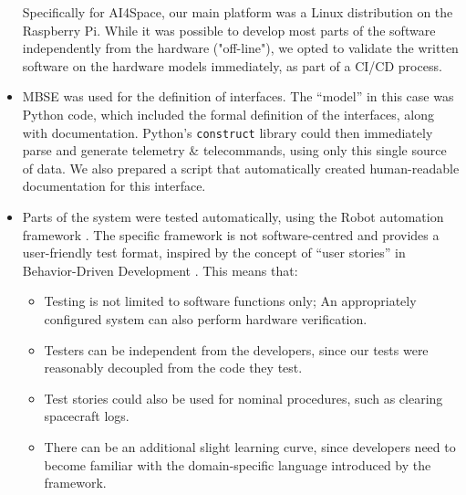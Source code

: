 \documentclass[]{iac}
\begin{document}
\begin{itemize}
    Specifically for AI4Space, our main platform was a Linux distribution on the Raspberry Pi. While it was possible to develop most parts of the software independently from the hardware ("off-line"), we opted to validate the written software on the hardware models immediately, as part of a CI/CD process.
    \item \acs*{MBSE} was used for the definition of interfaces. The ``model'' in this case was Python code, which included the formal definition of the interfaces, along with documentation. Python's \texttt{construct} library \autocite{bulski_construct_2020} could then immediately parse and generate telemetry \& telecommands, using only this single source of data. We also prepared a script that automatically created human-readable documentation for this interface.
    \item Parts of the system were tested automatically, using the Robot automation framework \autocite{robot_framework_foundation_robot_nodate}. The specific framework is not software-centred and provides a user-friendly test format, inspired by the concept of ``user stories'' in Behavior-Driven Development \autocite{north_whats_2007}. This means that:
    \begin{itemize}[itemsep=0pt]
        \item Testing is not limited to software functions only; An appropriately configured system can also perform hardware verification.
        \item Testers can be independent from the developers, since our tests were reasonably decoupled from the code they test.
        \item Test stories could also be used for nominal procedures, such as clearing spacecraft logs.%
        \item There can be an additional slight learning curve, since developers need to become familiar with the domain-specific language introduced by the framework.
    \end{itemize}
\end{itemize}
\end{document}
